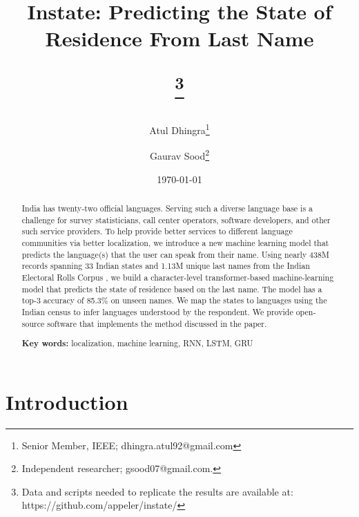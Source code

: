 \documentclass[11pt,  letterpaper]{article}
\title{Instate: Predicting the State of Residence From Last Name

\thanks{Data and scripts needed to replicate the results are available at: https://github.com/appeler/instate/}}
\author{Atul Dhingra\thanks{Senior Member, IEEE; \textsf{dhingra.atul92@gmail.com}} \and Gaurav Sood\thanks{Independent researcher;  \textsf{gsood07@gmail.com}.}}
\date{\today}
\begin{document}
\maketitle

\begin{abstract}

India has twenty-two official languages. Serving such a diverse language base is a challenge for survey statisticians, call center operators, software developers, and other such service providers. To help provide better services to different language communities via better localization, we introduce a new machine learning model that predicts the language(s) that the user can speak from their name. Using nearly 438M records spanning 33 Indian states and 1.13M unique last names from the Indian Electoral Rolls Corpus \citep{DVN/OG47IV_2023}, we build a character-level transformer-based machine-learning model that predicts the state of residence based on the last name. The model has a top-3 accuracy of 85.3\% on unseen names. We map the states to languages using the Indian census to infer languages understood by the respondent. We provide open-source software that implements the method discussed in the paper.

\smallskip

\textbf{Key words:} localization, machine learning, RNN, LSTM, GRU


\end{abstract}








\section{Introduction}
\end{document}
